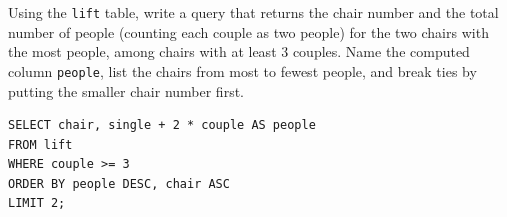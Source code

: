 \begin{blocksection}
\question Using the \lstinline{lift} table, write a query that returns the chair number and the total number of people (counting each couple as two people) for the two chairs with the most people, among chairs with at least 3 couples. Name the computed column \lstinline{people}, list the chairs from most to fewest people, and break ties by putting the smaller chair number first.

\begin{solution}[1.5in]
\begin{lstlisting}
SELECT chair, single + 2 * couple AS people
FROM lift
WHERE couple >= 3
ORDER BY people DESC, chair ASC
LIMIT 2;
\end{lstlisting}
\end{solution}
\end{blocksection}
